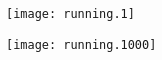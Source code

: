 \begin{figure} \centering
 \texttt{[image: running.1]}
 \end{figure}
 \clearpage

\begin{figure} \centering
 \texttt{[image: running.1000]}
 \end{figure}
 \clearpage

